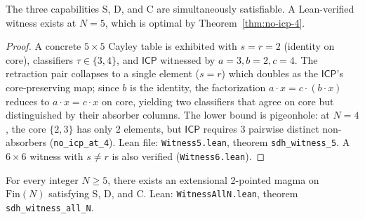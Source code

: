 \documentclass[sigconf,screen]{acmart}
\newcommand{\ICP}{\textsf{ICP}}
\newcommand{\Fin}{\mathrm{Fin}}
\theoremstyle{remark}
\begin{document}
\begin{theorem}
\label{thm:bound}
The three capabilities S, D, and C are simultaneously satisfiable. A Lean-verified witness exists at $N\!=\!5$, which is optimal by Theorem~\ref{thm:no-icp-4}.
\end{theorem}

\begin{proof}
A concrete $5 \times 5$ Cayley table is exhibited with $s\!=\!r\!=\!2$ (identity on core), classifiers $\tau \in \{3,4\}$, and $\ICP$ witnessed by $a\!=\!3, b\!=\!2, c\!=\!4$. The retraction pair collapses to a single element ($s\!=\!r$) which doubles as the $\ICP$'s core-preserving map; since $b$ is the identity, the factorization $a \cdot x = c \cdot (b \cdot x)$ reduces to $a \cdot x = c \cdot x$ on core, yielding two classifiers that agree on core but distinguished by their absorber columns. The lower bound is pigeonhole: at $N\!=\!4$, the core $\{2,3\}$ has only 2 elements, but $\ICP$ requires 3 pairwise distinct non-absorbers (\texttt{no\_icp\_at\_4}). Lean file: \texttt{Witness5.lean}, theorem \texttt{sdh\_witness\_5}. A $6 \times 6$ witness with $s \neq r$ is also verified (\texttt{Witness6.lean}).
\end{proof}

\begin{theorem}
\label{thm:scaling-witness}
For every integer $N \geq 5$, there exists an extensional 2-pointed magma on $\Fin(N)$ satisfying S, D, and C. Lean: \texttt{WitnessAllN.lean}, theorem \texttt{sdh\_witness\_all\_N}.
\end{theorem}
\end{document}
